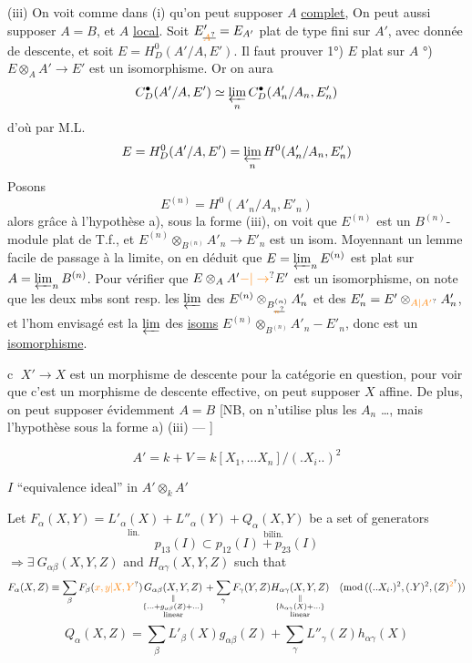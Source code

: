 (iii)  On voit comme dans (i) qu'on peut
supposer $A$  \uline{complet},  On peut aussi supposer
$A=B$, et $A$ \uline{local}. Soit $E'_{\deleted{\unsure{A}}}=E_{A'}$ plat de
type fini sur $A'$, avec donnée de descente, et
soit $E=H^0_D(A'/A,E')$. Il faut prouver
 1°) $E$ plat sur $A$ °) $E\otimes_A A'\to E'$ est un isomorphisme. Or on aura
\[
C^{\bullet}_D(A'/A,E')\simeq\varprojlim_n C^{\bullet}_D(A'_n/A_n,E'_n)
\]
d'où  par M.L.
\[
E=H^0_D(A'/A,E')=\varprojlim_n H^0(A'_n/A_n,E'_n)
\]
Posons
\[
E^{(n)}=H^0(A'_n/A_n,E'_n)
\]
alors grâce à  l'hypothèse a), sous la forme (iii),
on voit que $E^{(n)}$ est un $B^{(n)}$-module plat de
T.f., et $E^{(n)}\otimes_{B^{(n)}} A'_n\to E'_n$ est un isom.
Moyennant un lemme facile de passage à la limite,
on en déduit que $E=\varprojlim_n E^{(n)}$ est plat sur
$A=\varprojlim_n B^{(n)}$. Pour vérifier  que $E\otimes_A A'\unsure{-|\to} E'$ est
un isomorphisme, on note que les deux mbs sont
resp. les $\varprojlim$ des $E^{(n)}\otimes_{B^{(n)}_{\deleted{\unsure{n}}}} A'_n$ et des $E'_n=E'\otimes_{\unsure{A|A'}} A'_n$,
et l'hom envisagé est la $\varprojlim$ des \uline{isoms}
$E^{(n)}\otimes_{B^{(n)}} A'_n-E'_n$, donc est un \uline{isomorphisme}.

\textcircled{c}  $X'\to X$ est un morphisme de
descente pour la catégorie en question, pour voir que
c'est un morphisme de descente effective, on peut
supposer $X$ affine. De plus, on peut supposer
évidemment $A=B$ [NB, on n'utilise plus les $A_n$ \ldots, mais
l'hypothèse sous la forme
a) (iii) --- ]

\[
A'=k+V=k[X_1,\ldots X_n]/(.X_i..)^2
\]

$I$ ``equivalence ideal'' in $A'\otimes_k A'$

Let $F_\alpha(X,Y)=\underset{\text{lin.}}{L'_\alpha(X)}+L''_\alpha(Y)+\underset{\text{bilin.}}{Q_\alpha(X,Y)}$ be a set of generators
\[
p_{13}(I)\subset p_{12}(I)+p_{23}(I)
\]
$\Rightarrow\exists\ G_{\alpha\beta}(X,Y,Z)$ and $H_{\alpha\gamma}(X,Y,Z)$ such that
\[
F_\alpha(X,Z)\equiv\sum_\beta F_\beta(\unsure{x,y|X,Y})
\underset{\substack{\Vert\\\{\ldots+g_{\alpha\beta}(Z)+\ldots\}\\\text{linear}}}{G_{\alpha\beta}(X,Y,Z)}
+\sum_\gamma F_\gamma(Y,Z)
\underset{\substack{\Vert\\\{h_{\alpha\gamma}(X)+\ldots\}\\\text{linear}}}{H_{\alpha\gamma}(X,Y,Z)}
\quad(\mathrm{mod}\,((..X_i.)^2,(.Y)^2,(Z)^{\unsure{2}}))
\]
\[
Q_\alpha(X,Z)=\sum_\beta L'_\beta(X)g_{\alpha\beta}(Z)+\sum_\gamma L''_\gamma(Z)h_{\alpha\gamma}(X)
\]

